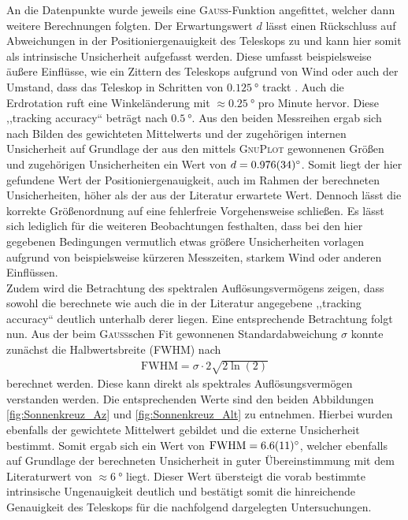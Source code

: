     An die Datenpunkte wurde jeweils eine \textsc{Gauß}-Funktion angefittet, welcher dann weitere Berechnungen folgten.
    Der Erwartungswert $d$ lässt einen Rückschluss auf Abweichungen in der Positioniergenauigkeit des Teleskops zu und kann hier somit als intrinsische Unsicherheit aufgefasst werden.
    Diese umfasst beispielsweise äußere Einflüsse, wie ein Zittern des Teleskops aufgrund von Wind oder auch der Umstand, dass das Teleskop in Schritten von $\SI{0.125}{\degree}$ trackt \cite{Usermanual}. Auch die Erdrotation ruft eine Winkeländerung mit $\approx \SI{0.25}{\degree}$ pro Minute hervor.
    Diese ,,tracking accuracy`` beträgt nach \cite{Usermanual} $\SI{0.5}{\degree}$. 
    Aus den beiden Messreihen ergab sich nach Bilden des gewichteten Mittelwerts und der zugehörigen internen Unsicherheit auf Grundlage der aus den mittels \textsc{GnuPlot} gewonnenen Größen und zugehörigen Unsicherheiten ein Wert von $d = \SI{0.976 \pm 0.034}{\degree}$.
    Somit liegt der hier gefundene Wert der Positioniergenauigkeit, auch im Rahmen der berechneten Unsicherheiten, höher als der aus der Literatur erwartete Wert. 
    Dennoch lässt die korrekte Größenordnung auf eine fehlerfreie Vorgehensweise schließen.
    Es lässt sich lediglich für die weiteren Beobachtungen festhalten, dass bei den hier gegebenen Bedingungen vermutlich etwas größere Unsicherheiten vorlagen aufgrund von beispielsweise kürzeren Messzeiten, starkem Wind oder anderen Einflüssen.\\ 


    Zudem wird die Betrachtung des spektralen Auflösungsvermögens zeigen, dass sowohl die berechnete wie auch die in der Literatur angegebene ,,tracking accuracy`` deutlich unterhalb derer liegen.
    Eine entsprechende Betrachtung folgt nun.
    Aus der beim \textsc{Gauß}schen Fit gewonnenen Standardabweichung $\sigma$ konnte zunächst die Halbwertsbreite (FWHM) nach \cite{wiki:FWHM}
    \begin{align}
        \text{FWHM} = \sigma \cdot 2\sqrt{2\ln(2)} \label{eq:FWHM}
    \end{align}
    berechnet werden.
    Diese kann direkt als spektrales Auflösungsvermögen verstanden werden.
    Die entsprechenden Werte sind den beiden Abbildungen \ref{fig:Sonnenkreuz_Az} und \ref{fig:Sonnenkreuz_Alt} zu entnehmen. Hierbei wurden ebenfalls der gewichtete Mittelwert gebildet und die externe Unsicherheit bestimmt.
    Somit ergab sich ein Wert von $\text{FWHM} = \SI{6.6 \pm 1.1}{\degree}$, welcher ebenfalls auf Grundlage der berechneten Unsicherheit in guter Übereinstimmung mit dem Literaturwert von $\approx \SI{6}{\degree}$ \cite{Usermanual} liegt. 
    Dieser Wert übersteigt die vorab bestimmte intrinsische Ungenauigkeit deutlich und bestätigt somit die hinreichende Genauigkeit des Teleskops für die nachfolgend dargelegten Untersuchungen.\\

